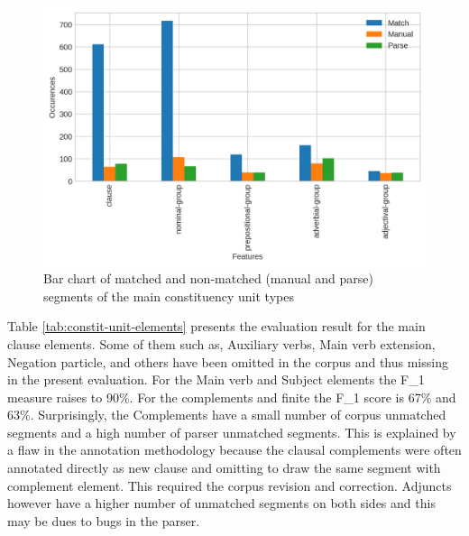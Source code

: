\begin{figure}[!ht]
    \centering
    \includegraphics[width=.65\textwidth]{evaluation-results/figures/accuracy-syntactic-group-types}
    \caption{Bar chart of matched and non-matched (manual and parse) segments of the main constituency unit types}
    \label{fig:constit-unit-types}
\end{figure}

Table \ref{tab:constit-unit-elements} presents the evaluation result for the main clause elements. Some of them such as, Auxiliary verbs, Main verb extension, Negation particle, and others have been omitted in the corpus and thus missing in the present evaluation. For the Main verb and Subject elements the F_1 measure raises to 90\%. For the complements and finite the F_1 score is 67\% and 63\%. Surprisingly, the Complements have a small number of corpus unmatched segments and a high number of parser unmatched segments. This is explained by a flaw in the annotation methodology because the clausal complements were often annotated directly as new clause and omitting to draw the same segment with complement element. This required the corpus revision and correction. Adjuncts however have a higher number of unmatched segments on both sides and this may be dues to bugs in the parser.

